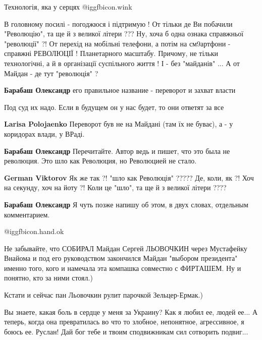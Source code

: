 \begin{itemize}
Технологія, яка у серцях  @igg{fbicon.wink} 

В головному посилі - погоджюся і підтримую !
От тільки де Ви побачили "Революцію", та ще й з великої літери ??? Ну, хоча б одна ознака справжньої "революції" ?!
От перехід на мобільні телефони, а потім на см9артфони - справжні РЕВОЛЮЦІЇ ! Планетарного масштабу. Причому, не тільки технологічні, а й в організації суспільного життя ! І - без "майданів" ...
А от Майдан - де тут "революція" ?

\begin{itemize} %
\textbf{Барабаш Олександр} его правильное название - переворот и захват власти

Под суд их надо. Если в будущем он у нас будет, то они ответят за все

\textbf{Larisa Polojaenko} Переворот був не на Майдані (там їх не буває), а - у коридорах влади, у ВРаді.

\textbf{Барабаш Олександр} Перечитайте. Автор ведь и пишет, что это была не революция. Это шло как Революция, но Революцией не стало.

\textbf{German Viktorov} Як же так ?!
"шло как Революція" ?????
Де, коли, як ?! Хоч на секунду, хоч на йоту ?! Коли це "шло", та ще й з великої літери ????

\textbf{Барабаш Олександр} Я чуть позже напишу об этом, в двух словах, отдельным комментарием.
\end{itemize} %

 @igg{fbicon.hand.ok} 


Не забывайте, что СОБИРАЛ Майдан Сергей ЛЬОВОЧКИН через Мустафейку Внайома и
под его руководством закончился Майдан "выбором президента" именно того, кого и
намечала эта компашка совместно с ФИРТАШЕМ. Ну и понятно, кто за ними стоял.)

Кстати и сейчас пан Льовочкин рулит парочкой Зельцер-Ермак.)


Вы знаете, какая боль в сердце у меня за Украину? Как я любил ее, людей ее... А
теперь, когда она превратилась во что то злобное, непонятное, агрессивное, я
боюсь ее. Руслан! Дай бог тебе и твоим сподвижникам сил сотворить подвиг...



\end{itemize}
